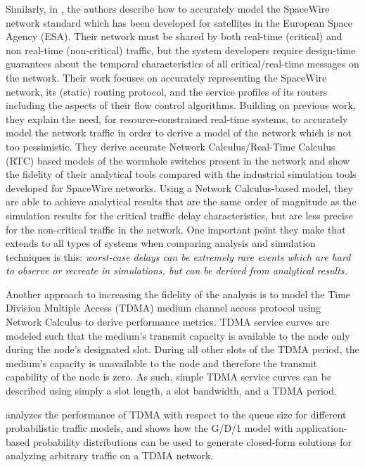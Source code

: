 Similarly, in \cite{NCspacewire}, the authors describe how to accurately model the SpaceWire network standard which has been developed for satellites in the European Space Agency (ESA).  Their network must be shared by both real-time (critical) and non real-time (non-critical) traffic, but the system developers require design-time guarantees about the temporal characteristics of all critical/real-time messages on the network.  Their work focuses on accurately representing the SpaceWire network, its (static) routing protocol, and the service profiles of its routers including the aspects of their flow control algorithms.  Building on previous work, they explain the need, for resource-constrained real-time systems, to accurately model the network traffic in order to derive a model of the network which is not too pessimistic.  They derive accurate Network Calculus/Real-Time Calculus (RTC) based models of the wormhole switches present in the network and show the fidelity of their analytical tools compared with the industrial simulation tools developed for SpaceWire networks.  Using a Network Calculus-based model, they are able to achieve analytical results that are the same order of magnitude as the simulation results for the critical traffic delay characteristics, but are less precise for the non-critical traffic in the network.  One important point they make that extends to all types of systems when comparing analysis and simulation techniques is this: \textit{worst-case delays can be extremely rare events which are hard to observe or recreate in simulations, but can be derived from analytical results.}\cite{NCspacewire}

Another approach to increasing the fidelity of the analysis is to model the Time Division Multiple Access (TDMA) medium channel access protocol using Network Calculus to derive performance metrics\cite{Schmitt2007}.  TDMA service curves are modeled such that the medium's transmit capacity is available to the node only during the node's designated slot.  During all other slots of the TDMA period, the medium's capacity is unavailable to the node and therefore the transmit capability of the node is zero.  As such, simple TDMA service curves can be described using simply a slot length, a slot bandwidth, and a TDMA period.

\cite{TDMA_Khan_98} analyzes the performance of TDMA with respect to the queue size for different probabilistic traffic models, and shows how the G/D/1 model with application-based probability distributions can be used to generate closed-form solutions for analyzing arbitrary traffic on a TDMA network.  

